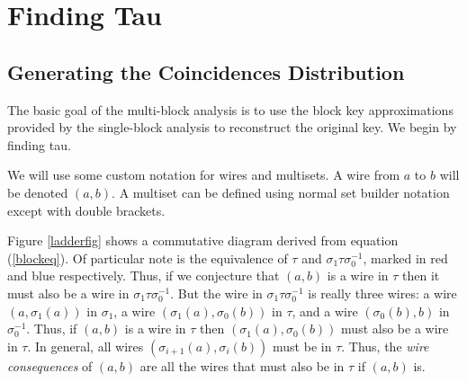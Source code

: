 \documentclass[12pt]{article}
\theoremstyle{definition}
\theoremstyle{remark}
\theoremstyle{remark}
\begin{document}
\section{Finding Tau}
\subsection{Generating the Coincidences Distribution}

\par
The basic goal of the multi-block analysis is to use the block key approximations provided by the single-block analysis to reconstruct the original key. We begin by finding tau.

\par
We will use some custom notation for wires and multisets. A wire from $a$ to $b$ will be denoted $(a,b)$. A multiset can be defined using normal set builder notation except with double brackets.
\par
Figure \ref{ladderfig} shows a commutative diagram derived from equation (\ref{blockeq}). Of particular note is the equivalence of $\tau$ and $\sigma_1 \tau \sigma^{-1}_0$, marked in red and blue respectively. Thus, if we conjecture that $(a,b)$ is a wire in $\tau$ then it must also be a wire in $\sigma_1 \tau \sigma^{-1}_0$. But the wire in $\sigma_1 \tau \sigma^{-1}_0$ is really three wires: a wire $(a,\sigma_1(a))$ in $\sigma_1$, a wire $(\sigma_1(a),\sigma_0(b))$ in $\tau$, and a wire $(\sigma_0(b), b)$ in $\sigma^{-1}_0$. Thus, if $(a,b)$ is a wire in $\tau$ then $(\sigma_1(a),\sigma_0(b))$ must also be a wire in $\tau$. In general, all wires $(\sigma_{i+1}(a),\sigma_i(b))$ must be in $\tau$. Thus, the \emph{wire consequences} of $(a,b)$ are all the wires that must also be in $\tau$ if $(a,b)$ is.
\end{document}
